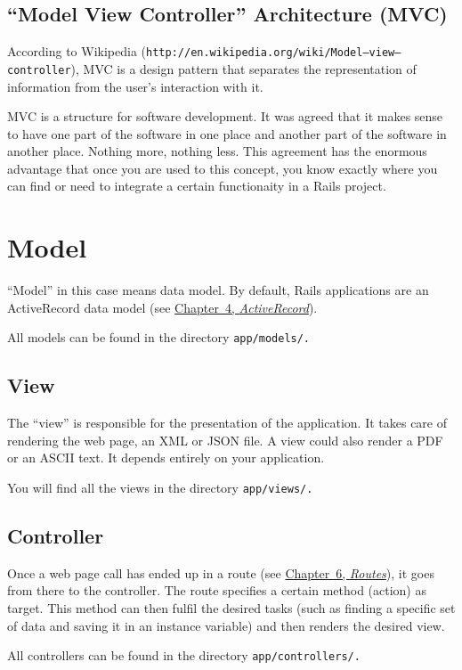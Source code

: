 \documentclass[a4paper]{book}
\newcommand{\chap}[1]{\newpage\thispagestyle{empty}\chapter{#1}\label{chap:\thechapter}}
\begin{document}
\section{“Model View Controller” Architecture (MVC)}\label{model-view-controller-architecture-mvc}

According to Wikipedia (\texttt{http://en.wikipedia.org/wiki/Model–view–controller}), MVC is a design pattern that separates the representation of information from the user's interaction with it.

MVC is a structure for software development. It was agreed that it makes sense to have one part of the software in one place and another part of the software in another place. Nothing more, nothing less. This agreement has the enormous advantage that once you are used to this concept, you know exactly where you can find or need to integrate a certain functionaity in a Rails project.

\chap{Model}\label{model}

“Model” in this case means data model. By default, Rails applications are an ActiveRecord data model (see \hyperref[activerecordux5fchapter]{Chapter~4, \emph{ActiveRecord}}).

All models can be found in the directory \texttt{app/models/.}

\section{View}\label{view}

The “view” is responsible for the presentation of the application. It takes care of rendering the web page, an XML or JSON file. A view could also render a PDF or an ASCII text. It depends entirely on your application.

You will find all the views in the directory \texttt{app/views/.}

\section{Controller}\label{controller}

Once a web page call has ended up in a route (see \hyperref[routes]{Chapter~6, \emph{Routes}}), it goes from there to the controller. The route specifies a certain method (action) as target. This method can then fulfil the desired tasks (such as finding a specific set of data and saving it in an instance variable) and then renders the desired view.

All controllers can be found in the directory \texttt{app/controllers/.}
\end{document}
